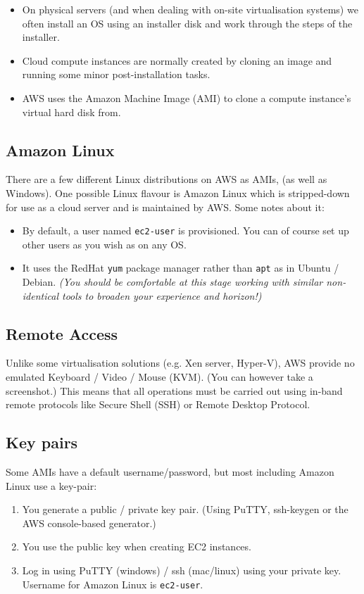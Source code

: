 \documentclass{pgnotes}
\begin{document}
\begin{itemize}
\item On physical servers (and when dealing with on-site virtualisation systems) we often install an OS using an installer disk and work through the steps of the installer. 
\item Cloud compute instances are normally created by cloning an image and running some minor post-installation tasks.
\item AWS uses the Amazon Machine Image (AMI) to clone a compute instance's virtual hard disk from. 
\end{itemize}


\subsection{Amazon Linux}

There are a few different Linux distributions on AWS as AMIs, (as well as Windows).
One possible Linux flavour is Amazon Linux which is stripped-down for use as a cloud server and is maintained by AWS.
Some notes about it:
\begin{itemize}
\item By default, a user named \texttt{ec2-user} is provisioned. You can of course set up other users as you wish as on any OS. 
\item It uses the RedHat \texttt{yum} package manager rather than \texttt{apt} as in Ubuntu / Debian. \textit{(You should be comfortable at this stage working with similar non-identical tools to broaden your experience and horizon!)}
\end{itemize}

\subsection{Remote Access}

Unlike some virtualisation solutions (e.g. Xen server, Hyper-V), AWS provide no emulated Keyboard / Video / Mouse (KVM).
(You can however take a screenshot.)
This means that all operations must be carried out using in-band remote protocols like Secure Shell (SSH) or Remote Desktop Protocol.

\subsection{Key pairs}

Some AMIs have a default username/password, but most including Amazon Linux use a key-pair:
\begin{enumerate}
\item You generate a public / private key pair. (Using PuTTY, ssh-keygen or the AWS console-based generator.)
\item You use the public key when creating EC2 instances.
\item Log in using PuTTY (windows) / ssh (mac/linux) using your private key. Username for Amazon Linux is \texttt{ec2-user}.
\end{enumerate}
\end{document}
